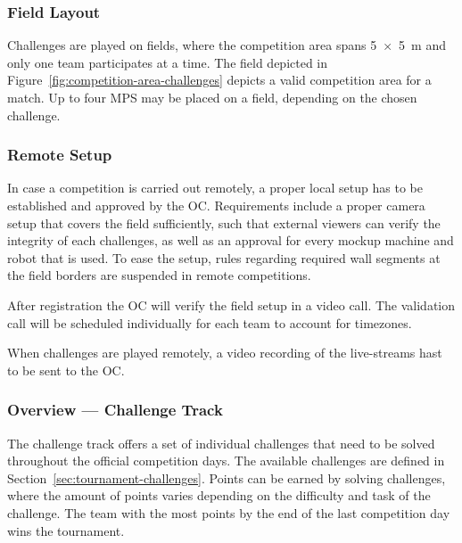 \documentclass[12pt,twoside]{article}
\newcommand{\refsec}[1]{Section~\ref{#1}}
\newcommand{\reffig}[1]{Figure~\ref{#1}}
\begin{document}
\subsubsection{Field Layout}
Challenges are played on fields, where the competition area spans
\SI{5 x 5}{\metre} and only one team participates at a time. %
The field depicted in \reffig{fig:competition-area-challenges} depicts a valid
competition area for a match.
Up to four \ac{MPS} may be placed on a field, depending on the chosen challenge.

\subsubsection{Remote Setup}
In case a competition is carried out remotely, a proper local setup has to
be established and approved by the \ac{OC}.
Requirements include a proper camera setup that covers the field sufficiently,
such that external viewers can verify the integrity of each challenges,
as well as an approval for every mockup machine and robot that is used.
To ease the setup, rules regarding required wall segments at the field borders
are suspended in remote competitions.

After registration the \ac{OC} will verify the field setup in a video call.
The validation call will be scheduled individually for each team
to account for timezones.

When challenges are played remotely, a video recording of the live-streams
hast to be sent to the \ac{OC}.


\subsubsection{Overview --- Challenge Track}
The challenge track offers a set of individual challenges that need to be solved
throughout the official competition days.
The available challenges are defined in \refsec{sec:tournament-challenges}.
Points can be earned by solving challenges, where the amount of points varies
depending on the difficulty and task of the challenge.
The team with the most points by the end of the last competition day wins
the tournament.
\end{document}

